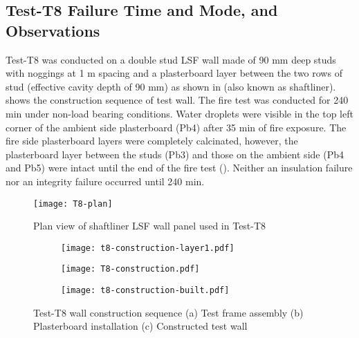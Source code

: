 \subsection{Test-T8 Failure Time and Mode, and Observations}

Test-T8 was conducted on a double stud LSF wall made of 90 mm deep studs with noggings at 1 m spacing and a plasterboard layer between the two rows of stud (effective cavity depth of 90 mm) as shown in  (also known as shaftliner).  shows the construction sequence of test wall. The fire test was conducted for 240 min under non-load bearing conditions. Water droplets were visible in the top left corner of the ambient side plasterboard (Pb4) after 35 min of fire exposure. The fire side plasterboard layers were completely calcinated, however, the plasterboard layer between the studs (Pb3) and those on the ambient side (Pb4 and Pb5) were intact until the end of the fire test (). Neither an insulation failure nor an integrity failure occurred until 240 min. 
\begin{figure}[!htbp]
	\centering
		\texttt{[image: T8-plan]}
		\caption{Plan view of shaftliner LSF wall panel used in Test-T8}
		\label{fig:T8-plan}
\end{figure}
\begin{figure}[!htbp]
	\centering
	\begin{subfigure}[b]{0.55\textwidth}
		\centering
		\texttt{[image: t8-construction-layer1.pdf]}
		\caption{}
		\label{subfig:t8-construction-layer1}
	\end{subfigure}
	\begin{subfigure}[b]{0.55\textwidth}
		\centering
		\texttt{[image: T8-construction.pdf]}
		\caption{}
		\label{subfig:T8-construction}
	\end{subfigure}
	\begin{subfigure}[b]{0.55\textwidth}
		\centering
		\texttt{[image: t8-construction-built.pdf]}
		\caption{}
		\label{subfig:t8-construction-built}
	\end{subfigure}
	   \caption{Test-T8 wall construction sequence (a) Test frame assembly (b) Plasterboard installation (c) Constructed test wall}
	   \label{fig:t8-construction-sequence}
\end{figure}
